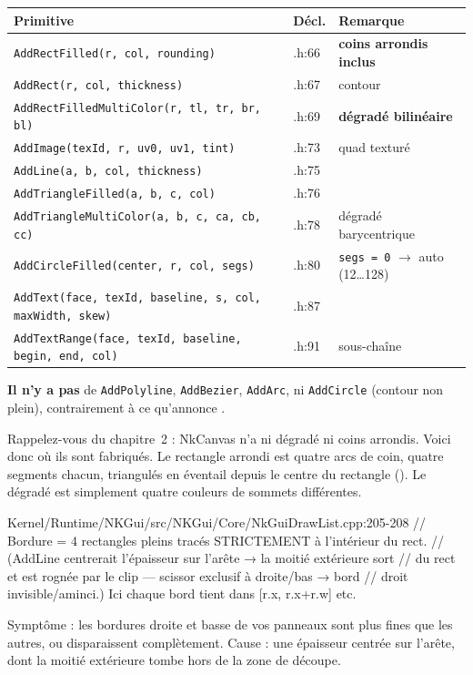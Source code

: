 \begin{center}
\begin{tabular}{@{}lll@{}}
\toprule
\textbf{Primitive} & \textbf{Décl.} & \textbf{Remarque} \\
\midrule
\texttt{AddRectFilled(r, col, rounding)}       & .h:66    & \textbf{coins arrondis inclus} \\
\texttt{AddRect(r, col, thickness)}            & .h:67    & contour \\
\texttt{AddRectFilledMultiColor(r, tl, tr, br, bl)} & .h:69 & \textbf{dégradé bilinéaire} \\
\texttt{AddImage(texId, r, uv0, uv1, tint)}    & .h:73    & quad texturé \\
\texttt{AddLine(a, b, col, thickness)}         & .h:75    & \\
\texttt{AddTriangleFilled(a, b, c, col)}       & .h:76    & \\
\texttt{AddTriangleMultiColor(a, b, c, ca, cb, cc)} & .h:78 & dégradé barycentrique \\
\texttt{AddCircleFilled(center, r, col, segs)} & .h:80    & \texttt{segs = 0} $\rightarrow$ auto (12\dots128) \\
\texttt{AddText(face, texId, baseline, s, col, maxWidth, skew)} & .h:87 & \\
\texttt{AddTextRange(face, texId, baseline, begin, end, col)}   & .h:91 & sous-chaîne \\
\bottomrule
\end{tabular}
\end{center}

\textbf{Il n'y a pas} de \texttt{AddPolyline}, \texttt{AddBezier},
\texttt{AddArc}, ni \texttt{AddCircle} (contour non plein), contrairement à ce
qu'annonce .

Rappelez-vous du chapitre~2 : NkCanvas n'a ni dégradé ni coins arrondis. Voici
donc où ils sont fabriqués. Le rectangle arrondi est quatre arcs de coin, quatre
segments chacun, triangulés en éventail depuis le centre du rectangle
(). Le dégradé est simplement quatre couleurs
de sommets différentes.

\begin{nkpiege}
\begin{nkcode}{Kernel/Runtime/NKGui/src/NKGui/Core/NkGuiDrawList.cpp:205-208}
// Bordure = 4 rectangles pleins tracés STRICTEMENT à l'intérieur du rect.
// (AddLine centrerait l'épaisseur sur l'arête → la moitié extérieure sort
// du rect et est rognée par le clip — scissor exclusif à droite/bas → bord
// droit invisible/aminci.) Ici chaque bord tient dans [r.x, r.x+r.w] etc.
\end{nkcode}
Symptôme : les bordures droite et basse de vos panneaux sont plus fines que les
autres, ou disparaissent complètement. Cause : une épaisseur centrée sur l'arête,
dont la moitié extérieure tombe hors de la zone de découpe.
\end{nkpiege}

